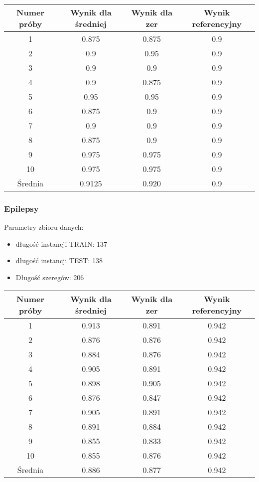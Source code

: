 \documentclass[12pt]{article}
\begin{document}
\begin{center}
\begin{tabular}{|c c c c|} 
 \hline
 Numer próby & Wynik dla średniej & Wynik dla zer & Wynik referencyjny \\ [0.5ex] 
 \hline\hline
 1 & 0.875 & 0.875 & 0.9 \\ 
 \hline
 2 & 0.9 & 0.95 & 0.9 \\
 \hline
 3 & 0.9 & 0.9 & 0.9 \\
 \hline
 4 & 0.9 & 0.875 & 0.9 \\
 \hline
  5 & 0.95 & 0.95 & 0.9 \\
 \hline
  6 & 0.875 & 0.9 & 0.9 \\
 \hline
  7 & 0.9 & 0.9 & 0.9 \\
 \hline
  8 & 0.875 & 0.9 & 0.9 \\
 \hline
  9 & 0.975 & 0.975 & 0.9 \\
 \hline
  10 & 0.975 & 0.975 & 0.9 \\
 \hline
 Średnia & 0.9125 & 0.920 & 0.9 \\
 \hline
\end{tabular}
\end{center}

\subsubsection*{Epilepsy}
Parametry zbioru danych:
\begin{itemize}
  \item długość instancji TRAIN: 137
  \item długość instancji TEST: 138
  \item Długość szeregów: 206
\end{itemize}

\begin{center}
\begin{tabular}{|c c c c|} 
 \hline
 Numer próby & Wynik dla średniej & Wynik dla zer & Wynik referencyjny \\ [0.5ex] 
 \hline
 1 & 0.913 & 0.891 & 0.942 \\ 
 \hline
 2 & 0.876 & 0.876 & 0.942 \\
 \hline
 3 & 0.884 & 0.876 & 0.942 \\
 \hline
 4 & 0.905 & 0.891 & 0.942 \\
 \hline
  5 & 0.898 & 0.905 & 0.942 \\
 \hline
  6 & 0.876 & 0.847 & 0.942 \\
 \hline
  7 & 0.905 & 0.891 & 0.942 \\
 \hline
  8 & 0.891 & 0.884 & 0.942 \\
 \hline
  9 & 0.855 & 0.833 & 0.942 \\
 \hline
  10 & 0.855 & 0.876 & 0.942 \\
 \hline
 Średnia & 0.886 & 0.877 & 0.942 \\
 \hline
\end{tabular}
\end{center}
\end{document}
